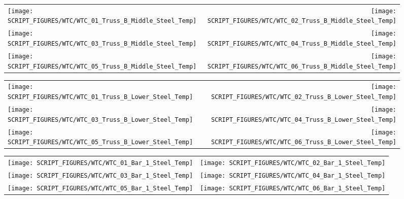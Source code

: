\begin{figure}[p]
\begin{tabular*}{\textwidth}{l@{\extracolsep{\fill}}r}
\texttt{[image: SCRIPT\_FIGURES/WTC/WTC\_01\_Truss\_B\_Middle\_Steel\_Temp]} &
\texttt{[image: SCRIPT\_FIGURES/WTC/WTC\_02\_Truss\_B\_Middle\_Steel\_Temp]} \\
\texttt{[image: SCRIPT\_FIGURES/WTC/WTC\_03\_Truss\_B\_Middle\_Steel\_Temp]} &
\texttt{[image: SCRIPT\_FIGURES/WTC/WTC\_04\_Truss\_B\_Middle\_Steel\_Temp]} \\
\texttt{[image: SCRIPT\_FIGURES/WTC/WTC\_05\_Truss\_B\_Middle\_Steel\_Temp]} &
\texttt{[image: SCRIPT\_FIGURES/WTC/WTC\_06\_Truss\_B\_Middle\_Steel\_Temp]}
\end{tabular*}
\label{NIST_WTC_Truss_B_Middle_Steel_Temp}
\end{figure}

\begin{figure}[p]
\begin{tabular*}{\textwidth}{l@{\extracolsep{\fill}}r}
\texttt{[image: SCRIPT\_FIGURES/WTC/WTC\_01\_Truss\_B\_Lower\_Steel\_Temp]} &
\texttt{[image: SCRIPT\_FIGURES/WTC/WTC\_02\_Truss\_B\_Lower\_Steel\_Temp]} \\
\texttt{[image: SCRIPT\_FIGURES/WTC/WTC\_03\_Truss\_B\_Lower\_Steel\_Temp]} &
\texttt{[image: SCRIPT\_FIGURES/WTC/WTC\_04\_Truss\_B\_Lower\_Steel\_Temp]} \\
\texttt{[image: SCRIPT\_FIGURES/WTC/WTC\_05\_Truss\_B\_Lower\_Steel\_Temp]} &
\texttt{[image: SCRIPT\_FIGURES/WTC/WTC\_06\_Truss\_B\_Lower\_Steel\_Temp]}
\end{tabular*}
\label{NIST_WTC_Truss_B_Lower_Steel_Temp}
\end{figure}


\begin{figure}[p]
\begin{tabular*}{\textwidth}{l@{\extracolsep{\fill}}r}
\texttt{[image: SCRIPT\_FIGURES/WTC/WTC\_01\_Bar\_1\_Steel\_Temp]} &
\texttt{[image: SCRIPT\_FIGURES/WTC/WTC\_02\_Bar\_1\_Steel\_Temp]} \\
\texttt{[image: SCRIPT\_FIGURES/WTC/WTC\_03\_Bar\_1\_Steel\_Temp]} &
\texttt{[image: SCRIPT\_FIGURES/WTC/WTC\_04\_Bar\_1\_Steel\_Temp]} \\
\texttt{[image: SCRIPT\_FIGURES/WTC/WTC\_05\_Bar\_1\_Steel\_Temp]} &
\texttt{[image: SCRIPT\_FIGURES/WTC/WTC\_06\_Bar\_1\_Steel\_Temp]}
\end{tabular*}
\label{NIST_WTC_Bar_1_Steel_Temp}
\end{figure}


